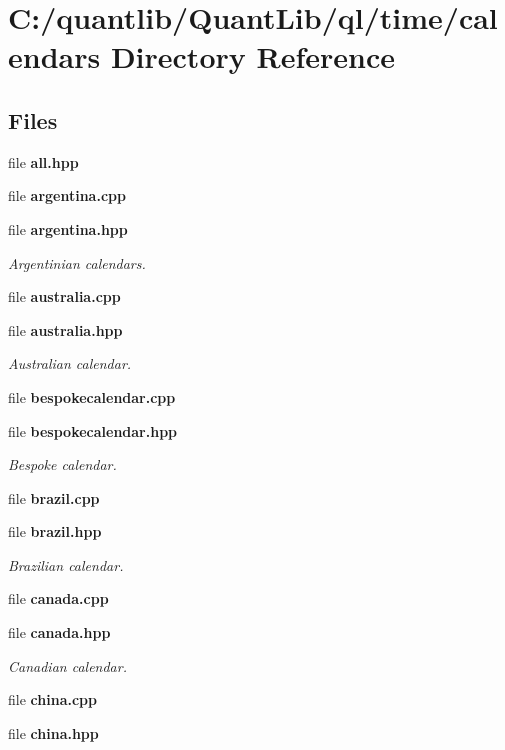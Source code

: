 \section{C\+:/quantlib/\+Quant\+Lib/ql/time/calendars Directory Reference}
\label{dir_1cea141b1b724fa780030e3cbd8f3e30}
\subsection*{Files}
\begin{DoxyCompactItemize}
\item 
file {\bf all.\+hpp}
\item 
file {\bf argentina.\+cpp}
\item 
file {\bf argentina.\+hpp}
\begin{DoxyCompactList}\small\item\em Argentinian calendars. \end{DoxyCompactList}\item 
file {\bf australia.\+cpp}
\item 
file {\bf australia.\+hpp}
\begin{DoxyCompactList}\small\item\em Australian calendar. \end{DoxyCompactList}\item 
file {\bf bespokecalendar.\+cpp}
\item 
file {\bf bespokecalendar.\+hpp}
\begin{DoxyCompactList}\small\item\em Bespoke calendar. \end{DoxyCompactList}\item 
file {\bf brazil.\+cpp}
\item 
file {\bf brazil.\+hpp}
\begin{DoxyCompactList}\small\item\em Brazilian calendar. \end{DoxyCompactList}\item 
file {\bf canada.\+cpp}
\item 
file {\bf canada.\+hpp}
\begin{DoxyCompactList}\small\item\em Canadian calendar. \end{DoxyCompactList}\item 
file {\bf china.\+cpp}
\item 
file {\bf china.\+hpp}

\end{DoxyCompactItemize}
